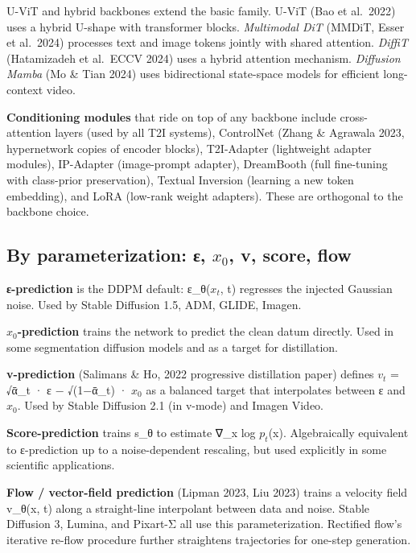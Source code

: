 U-ViT and hybrid backbones extend the basic family. U-ViT (Bao et al.~2022) uses a hybrid U-shape with transformer blocks. \emph{Multimodal DiT} (MMDiT, Esser et al.~2024) processes text and image tokens jointly with shared attention. \emph{DiffiT} (Hatamizadeh et al.~ECCV 2024) uses a hybrid attention mechanism. \emph{Diffusion Mamba} (Mo \& Tian 2024) uses bidirectional state-space models for efficient long-context video.

\textbf{Conditioning modules} that ride on top of any backbone include cross-attention layers (used by all T2I systems), ControlNet (Zhang \& Agrawala 2023, hypernetwork copies of encoder blocks), T2I-Adapter (lightweight adapter modules), IP-Adapter (image-prompt adapter), DreamBooth (full fine-tuning with class-prior preservation), Textual Inversion (learning a new token embedding), and LoRA (low-rank weight adapters). These are orthogonal to the backbone choice.

\subsection{\texorpdfstring{By parameterization: ε, \(x_0\), v, score, flow}{By parameterization: ε, x\_0, v, score, flow}}\label{by-parameterization-ux3b5-x_0-v-score-flow}

\textbf{ε-prediction} is the DDPM default: ε\_θ(\(x_t\), t) regresses the injected Gaussian noise. Used by Stable Diffusion 1.5, ADM, GLIDE, Imagen.

\textbf{\(x_0\)-prediction} trains the network to predict the clean datum directly. Used in some segmentation diffusion models and as a target for distillation.

\textbf{v-prediction} (Salimans \& Ho, 2022 progressive distillation paper) defines \(v_t\) = √ᾱ\_t · ε − √(1−ᾱ\_t) · \(x_0\) as a balanced target that interpolates between ε and \(x_0\). Used by Stable Diffusion 2.1 (in v-mode) and Imagen Video.

\textbf{Score-prediction} trains s\_θ to estimate ∇\_x log \(p_t\)(x). Algebraically equivalent to ε-prediction up to a noise-dependent rescaling, but used explicitly in some scientific applications.

\textbf{Flow / vector-field prediction} (Lipman 2023, Liu 2023) trains a velocity field v\_θ(x, t) along a straight-line interpolant between data and noise. Stable Diffusion 3, Lumina, and Pixart-Σ all use this parameterization. Rectified flow's iterative re-flow procedure further straightens trajectories for one-step generation.

